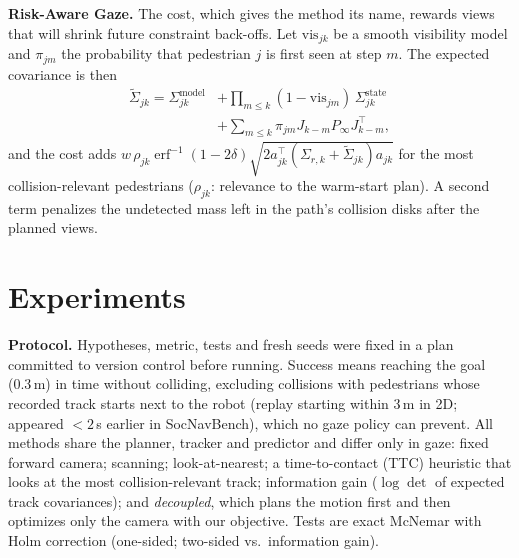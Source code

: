 \documentclass[conference]{IEEEtran}
\begin{document}
\textbf{Risk-Aware Gaze.} The cost, which gives the method its name, rewards views that will shrink future constraint back-offs. Let $\mathrm{vis}_{jk}$ be a smooth visibility model and $\pi_{jm}$ the probability that pedestrian $j$ is first seen at step $m$. The expected covariance is then
\begin{equation}
\begin{aligned}
\tilde\Sigma_{jk} = \Sigma^\text{model}_{jk} &+ \textstyle\prod_{m\le k}(1-\mathrm{vis}_{jm})\,\Sigma^\text{state}_{jk}\\
&+ \textstyle\sum_{m\le k}\pi_{jm} J_{k-m}P_\infty J_{k-m}^\top,
\end{aligned}
\end{equation}
and the cost adds $w\,\rho_{jk}\operatorname{erf}^{-1}(1-2\delta)\sqrt{2a_{jk}^\top(\Sigma_{r,k}+\tilde\Sigma_{jk})a_{jk}}$ for the most collision-relevant pedestrians ($\rho_{jk}$: relevance to the warm-start plan). A second term penalizes the undetected mass left in the path's collision disks after the planned views.

\section{Experiments}
\textbf{Protocol.} Hypotheses, metric, tests and fresh seeds were fixed in a plan committed to version control before running. Success means reaching the goal (0.3\,m) in time without colliding, excluding collisions with pedestrians whose recorded track starts next to the robot (replay starting within 3\,m in 2D; appeared $<2$\,s earlier in SocNavBench), which no gaze policy can prevent. All methods share the planner, tracker and predictor and differ only in gaze: fixed forward camera; scanning; look-at-nearest; a time-to-contact (TTC) heuristic that looks at the most collision-relevant track; information gain ($\log\det$ of expected track covariances); and \emph{decoupled}, which plans the motion first and then optimizes only the camera with our objective. Tests are exact McNemar with Holm correction (one-sided; two-sided vs.\ information gain).
\end{document}
